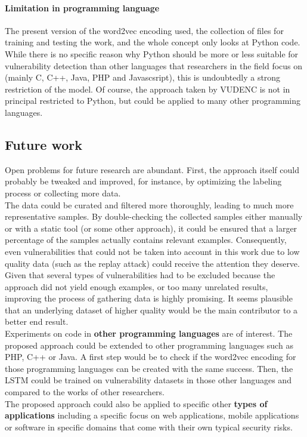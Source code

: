 \documentclass[
a4paper,
pagesize,
pdftex,
12pt,
ngerman,
fleqn,
final,
]{scrartcl}
\begin{document}
	\paragraph{Limitation in programming language}
	The present version of the word2vec encoding used, the collection of files for training and testing the work, and the whole concept only looks at Python code. While there is no specific reason why Python should be more or less suitable for vulnerability detection than other languages that researchers in the field focus on (mainly C, C++, Java, PHP and Javascsript), this is undoubtedly a strong restriction of the model. Of course, the approach taken by VUDENC is not in principal restricted to Python, but could be applied to many other programming languages. 	
	\subsection{Future work}
	Open problems for future research are abundant. First, the approach itself could probably be tweaked and improved, for instance, by optimizing the labeling process or collecting more data.\\
	The data could be curated and filtered more thoroughly, leading to much more representative samples. By double-checking the collected samples either manually or with a static tool (or some other approach), it could be ensured that a larger percentage of the samples actually contains relevant examples. Consequently, even vulnerabilities that could not be taken into account in this work due to low quality data (such as the replay attack) could receive the attention they deserve. Given that several types of vulnerabilities had to be excluded because the approach did not yield enough examples, or too many unrelated results, improving the process of gathering data is highly promising. It seems plausible that an underlying dataset of higher quality would be the main contributor to a better end result.\\
	Experiments on code in \textbf{other programming languages} are of interest. The proposed approach could be extended to other programming languages such as PHP, C++ or Java. A first step would be to check if the word2vec encoding for those programming languages can be created with the same success. Then, the LSTM could be trained on vulnerability datasets in those other languages and compared to the works of other researchers. \\
	The proposed approach could also be applied to specific other \textbf{types of applications} including a specific focus on web applications, mobile applications or software in specific domains that come with their own typical security risks.\\
\end{document}
